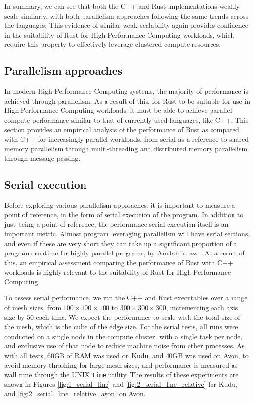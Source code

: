 In summary, we can see that both the C++ and Rust implementations weakly scale similarly, with both parallelism approaches following the same trends across the languages. This evidence of similar weak scalability again provides confidence in the suitability of Rust for High-Performance Computing workloads, which require this property to effectively leverage clustered compute resources.




\subsection{Parallelism approaches}
\label{ssec:parallelism-approaches}

In modern High-Performance Computing systems, the majority of performance is achieved through parallelism. As a result of this, for Rust to be suitable for use in High-Performance Computing workloads, it must be able to achieve parallel compute performance similar to that of currently used languages, like C++. This section provides an empirical analysis of the performance of Rust as compared with C++ for increasingly parallel workloads, from serial as a reference to shared memory parallelism through multi-threading and distributed memory parallelism through message passing.

\subsection{Serial execution}
\label{ssec:multi-threaded}

Before exploring various parallelism approaches, it is important to measure a point of reference, in the form of serial execution of the program. In addition to just being a point of reference, the performance serial execution itself is an important metric. Almost program leveraging parallelism will have serial sections, and even if these are very short they can take up a significant proportion of a programs runtime for highly parallel programs, by Amdahl's law \cite{amdahlsLaw}. As a result of this, an empirical assessment comparing the performance of Rust with C++ workloads is highly relevant to the suitability of Rust for High-Performance Computing.

To assess serial performance, we ran the C++ and Rust executables over a range of mesh sizes, from $100 \times 100 \times 100$ to $300 \times 300 \times 300$, incrementing each axis size by $50$ each time. We expect the performance to scale with the total size of the mesh, which is the cube of the edge size. For the serial tests, all runs were conducted on a single node in the compute cluster, with a single task per node, and exclusive use of that node to reduce machine noise from other processes. As with all tests, 60GB of RAM was used on Kudu, and 40GB was used on Avon, to avoid memory thrashing for large mesh sizes, and performance is measured as wall time through the UNIX \texttt{time} utility. The results of these experiments are shown in Figures \ref{fig:1_serial_line} and \ref{fig:2_serial_line_relative} for Kudu, and \ref{fig:2_serial_line_relative_avon} on Avon.

